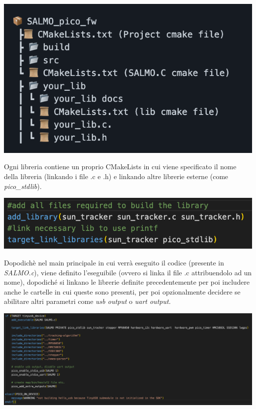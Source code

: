 \begin{center}
\includegraphics[scale=1]{figures/image73.png}
\captionsetup{type=figure}
\end{center}

Ogni libreria contiene un proprio CMakeLists in cui viene specificato il
nome della libreria (linkando i file .c e .h) e linkando altre librerie
esterne (come \emph{pico\_stdlib}).

\begin{center}
\includegraphics[scale=1]{figures/image45.png}
\captionsetup{type=figure}
\end{center}

Dopodichè nel main principale in cui verrà eseguito il codice (presente
in \emph{SALMO.c}), viene definito l'eseguibile (ovvero si linka il file
.c attribuendolo ad un nome), dopodiché si linkano le librerie definite
precedentemente per poi includere anche le cartelle in cui queste sono
presenti, per poi opzionalmente decidere se abilitare altri parametri
come \emph{usb output} o \emph{uart output.}

\begin{center}
\includegraphics[scale=0.45]{figures/image66.png}
\captionsetup{type=figure}
\end{center}

